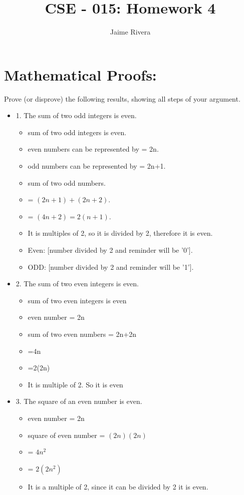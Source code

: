 \documentclass[11pt]{article}
\title{CSE - 015: Homework 4}
\author{Jaime Rivera}
\begin{document}
\maketitle

\section{Mathematical Proofs:}

Prove (or disprove) the following results, showing all steps of your argument.

\begin{itemize}

\item 1. The sum of two odd integers is even.
\begin{itemize}
\item sum of two odd integers is even.
\item even numbers can be represented by = 2n.
\item odd numbers can be represented by = 2n+1.
\item sum of two odd numbers.
\item = $(2n+1) + (2n+2)$.
\item = $(4n+2) = 2(n+1)$.
\item It is multiples of 2, so it is divided by 2, therefore it is even. 
\item Even: [number divided by 2 and reminder will be '0'].
\item ODD: [number divided by 2 and reminder will be '1'].
\end{itemize} 

\item 2. The sum of two even integers is even.
\begin{itemize}
\item sum of two even integers is even
\item even number = 2n
\item sum of two even numbers = 2n+2n
\item =4n
\item =2(2n)
\item It is multiple of 2. So it is even 
\end{itemize} 


\item 3. The square of an even number is even.
\begin{itemize}
\item even number = 2n
\item square of even number = $(2n)(2n)$
\item = $4n^2$
\item = $2(2n^2)$
\item It is a multiple of 2, since it can be divided by 2 it is  even.
\end{itemize} 


\end{itemize}
\end{document}

